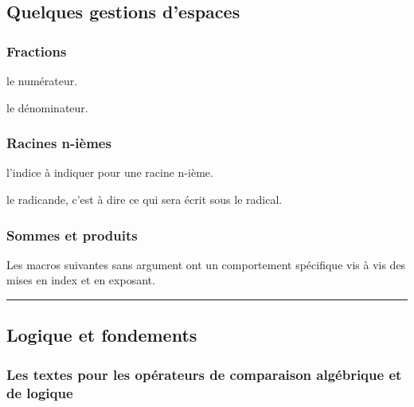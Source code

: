 \documentclass[12pt,a4paper]{article}
\theoremstyle{definition}
\newcommand\separation{
	\medskip
	\hfill\rule{0.5\textwidth}{0.75pt}\hfill
	\medskip
}
\newcommand\extraspace{
	\vspace{0.25em}
}
\begin{document}
\subsection{Quelques gestions d'espaces}

\subsubsection{Fractions}



\extraspace




 le numérateur.

 le dénominateur.
\subsubsection{Racines n-ièmes}




\IDoption{} l'indice à indiquer pour une racine n-ième.

\IDarg{} le radicande, c'est à dire ce qui sera écrit sous le radical.
\subsubsection{Sommes et produits}

Les macros suivantes sans argument ont un comportement spécifique vis à vis des mises en index et en exposant. 


\separation




\subsection{Logique et fondements}

\subsubsection{Les textes pour les opérateurs de \og comparaison algébrique \fg et de logique}

\end{document}
